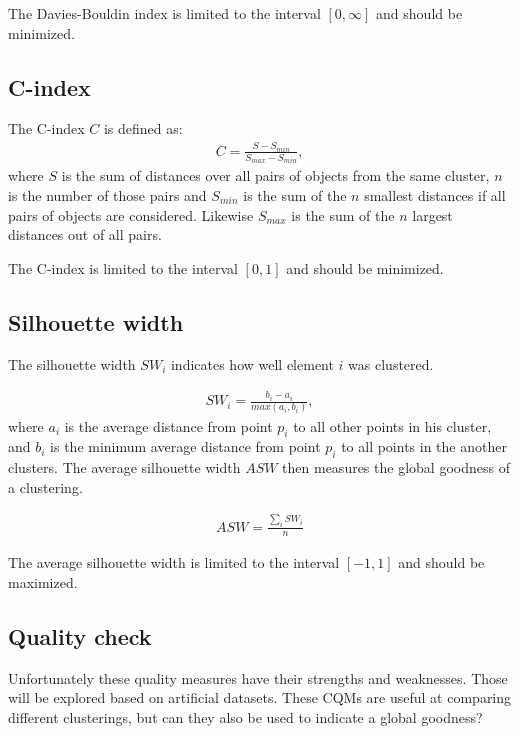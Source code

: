 \vspace{.5em}
\noindent
The Davies-Bouldin index is limited to the interval $[0, \infty]$ and should be minimized.

\subsection{C-index}
The C-index\cite{Hubert1976} $C$ is defined as:
\begin{align}
C = \frac{S - S_{min}}{S_{max} - S_{min}},
\end{align}
%
where $S$ is the sum of distances over all pairs of objects from the same cluster, $n$ is the number of those pairs and $S_{min}$ is the sum of the $n$ smallest distances if all pairs of objects are considered. Likewise $S_{max}$ is the sum of the $n$ largest distances out of all pairs.

\vspace{.5em}
\noindent
The C-index is limited to the interval $[0, 1]$ and should be minimized.


\subsection{Silhouette width}
The silhouette width\cite{Rousseeuw1987} $SW_i$ indicates how well element $i$ was clustered.

\begin{align}
SW_i = \frac{b_i-a_i}{max(a_i, b_i)},
\end{align}
where $a_i$ is the average distance from point $p_i$ to all other points in his cluster, and $b_i$ is the minimum average distance from point $p_i$ to all points in the another clusters. The average silhouette width $ASW$ then measures the global goodness of a clustering.

\begin{align}
ASW = \frac{\sum_i SW_i}{n}
\end{align}

\vspace{.5em}
\noindent
The average silhouette width is limited to the interval $[-1, 1]$ and should be maximized.

\subsection{Quality check}\label{sec:qcheck}
Unfortunately these quality measures have their strengths and weaknesses. Those will be explored based on artificial datasets. These CQMs are useful at comparing different clusterings, but can they also be used to indicate a global goodness?

